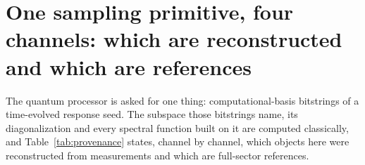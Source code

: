 %
%

\section{One sampling primitive, four channels: which are reconstructed and which are references}
\label{sec:method}

The quantum processor is asked for one thing: computational-basis bitstrings of a time-evolved
response seed. The subspace those bitstrings name, its diagonalization and every spectral function built
on it are computed classically, and Table~\ref{tab:provenance} states, channel by channel, which objects
here were reconstructed from measurements and which are full-sector references.


